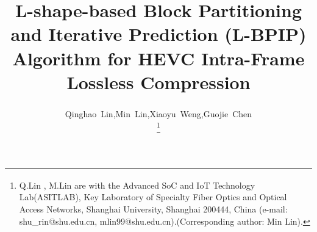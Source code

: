 \documentclass[journal]{IEEEtran}
\begin{document}
%
\title{L-shape-based Block Partitioning and Iterative Prediction (L-BPIP) Algorithm for HEVC Intra-Frame Lossless Compression}
%
%
%

\author{Qinghao~Lin,Min~Lin\textsuperscript{\Letter},Xiaoyu~Weng,Guojie~Chen

\thanks{Q.Lin , M.Lin\textsuperscript{\Letter} are with the Advanced SoC and IoT Technology Lab(ASITLAB), Key Laboratory of Specialty Fiber Optics and Optical Access Networks, Shanghai University, Shanghai 200444, China (e-mail: shu\_rin@shu.edu.cn, mlin99@shu.edu.cn).(Corresponding author: Min Lin).}}




% 
%
\end{document}
